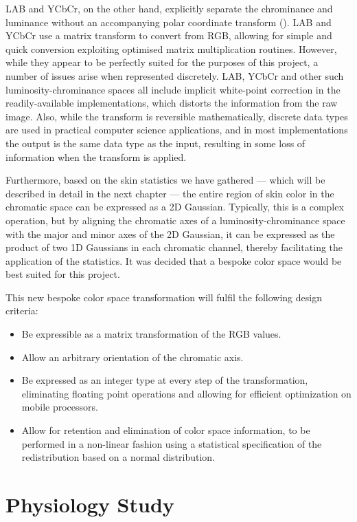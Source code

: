 LAB and YCbCr, on the other hand, explicitly separate the chrominance and luminance without an accompanying polar coordinate transform (\cite{Vezhnevets2003,Poynton1997,Phung2002a}). LAB and YCbCr use a matrix transform to convert from RGB, allowing for simple and quick conversion exploiting optimised matrix multiplication routines. However, while they appear to be perfectly suited for the purposes of this project, a number of issues arise when represented discretely. LAB, YCbCr and other such luminosity-chrominance spaces all include implicit white-point correction in the readily-available implementations, which distorts the information from the raw image. Also, while the transform is reversible mathematically, discrete data types are used in practical computer science applications, and in most implementations the output is the same data type as the input, resulting in some loss of information when the transform is applied.

Furthermore, based on the skin statistics we have gathered --- which will be described in detail in the next chapter --- the entire region of skin color in the chromatic space can be expressed as a 2D Gaussian. Typically, this is a complex operation, but by aligning the chromatic axes of a luminosity-chrominance space with the major and minor axes of the 2D Gaussian, it can be expressed as the product of two 1D Gaussians in each chromatic channel, thereby facilitating the application of the statistics. It was decided that a bespoke color space would be best suited for this project. 

This new bespoke color space transformation will fulfil the following design criteria:

\begin{itemize}
\item Be expressible as a matrix transformation of the RGB values.
\item Allow an arbitrary orientation of the chromatic axis.
\item Be expressed as an integer type at every step of the transformation, eliminating floating point operations and allowing for efficient optimization on mobile processors.
\item Allow for retention and elimination of color space information, to be performed in a non-linear fashion using a statistical specification of the redistribution based on a normal distribution.
\end{itemize}


\section{Physiology Study}\label{sec:PhysiologyStudy}

